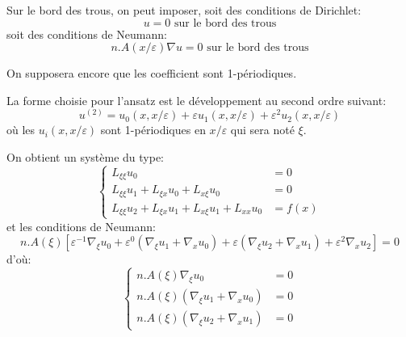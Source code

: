 Sur le bord des trous, on peut imposer, soit des conditions de Dirichlet:
\begin{equation}u=0 \text{ sur le bord des trous} \end{equation}
soit des conditions de Neumann:
\begin{equation}n.A(x/\varepsilon)\nabla u=0 \text{ sur le bord des trous}\end{equation}

On supposera encore que les coefficient sont 1-périodiques.

\medskip
{}

La forme choisie pour l'ansatz est le développement au second ordre suivant:
\begin{equation}u^{(2)} = u_0(x,x/\varepsilon)+\varepsilon u_1(x,x/\varepsilon) + \varepsilon^2 u_2(x,x/\varepsilon)\end{equation}
où les $u_i(x,x/\varepsilon)$ sont 1-périodiques en $x/\varepsilon$ qui sera noté $\xi$.

On obtient un système du type:
\begin{equation}\left\{
\begin{array}{ll}
L_{\xi\xi} u_0 &=0\\
L_{\xi\xi}u_1+L_{\xi x}u_0+L_{x\xi}u_0 &=0\\
L_{\xi\xi}u_2+L_{\xi x}u_1+L_{x\xi}u_1 +L_{xx}u_0 &=f(x)
\end{array}
\right. \end{equation}
et les conditions de Neumann:
\begin{equation} n.A(\xi)\left[ \varepsilon^{-1}\nabla_\xi u_0 + \varepsilon^0 (\nabla_\xi u_1+\nabla_x u_0) +
\varepsilon(\nabla_\xi u_2+\nabla_x u_1)+\varepsilon^2\nabla_x u_2
\right]=0 \end{equation}
d'où:
\begin{equation}\left\{
\begin{array}{ll}
n.A(\xi)\nabla_\xi u_0 &=0\\
n.A(\xi) (\nabla_\xi u_1+\nabla_x u_0) &=0\\
n.A(\xi)(\nabla_\xi u_2+\nabla_x u_1) &=0
\end{array}
\right. \end{equation}

